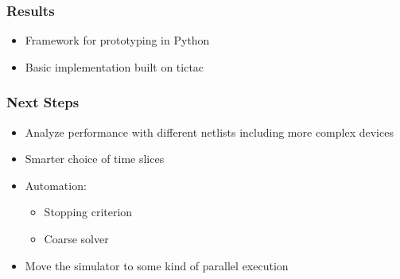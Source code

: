 \begin{frame}
\frametitle{Results}
\begin{itemize}[<+->]
    \item Framework for prototyping in Python
    \item Basic implementation built on tictac
\end{itemize}
\end{frame}

\begin{frame}
\frametitle{Next Steps}
\begin{itemize}[<+->]
    \item Analyze performance with different netlists including more complex devices
    \item Smarter choice of time slices
    \item Automation:
        \begin{itemize}
            \item Stopping criterion
            \item Coarse solver
        \end{itemize}
    \item Move the simulator to some kind of parallel execution
\end{itemize}
\end{frame}
